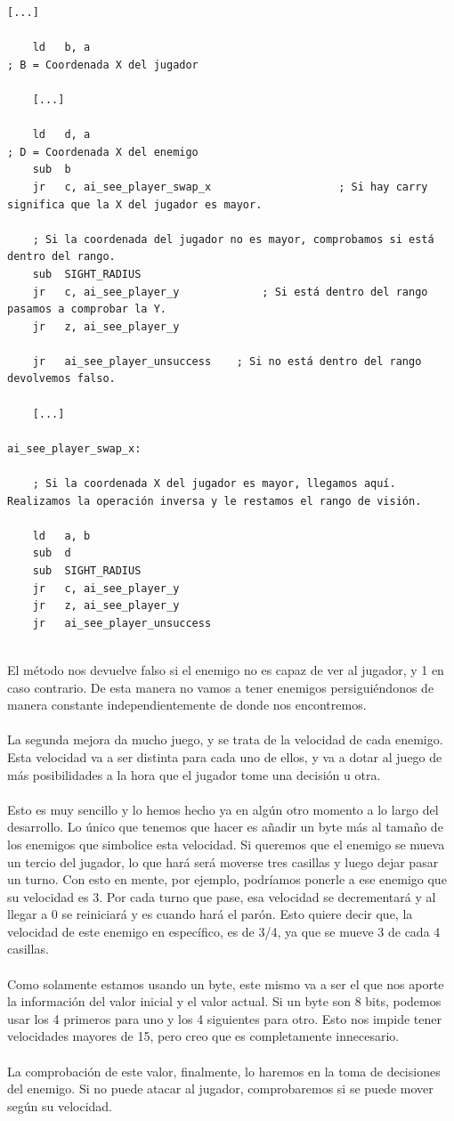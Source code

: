 \begin{lstlisting}[caption={Rango de Visión en los Enemigos}, label={code:sightradius}]
	[...]

	ld 	 b, a 															; B = Coordenada X del jugador

	[...]

	ld 	 d, a 															; D = Coordenada X del enemigo
	sub  b
	jr 	 c, ai_see_player_swap_x 	 				; Si hay carry significa que la X del jugador es mayor.

	; Si la coordenada del jugador no es mayor, comprobamos si está dentro del rango.
	sub  SIGHT_RADIUS
	jr 	 c, ai_see_player_y 			; Si está dentro del rango pasamos a comprobar la Y.
	jr 	 z, ai_see_player_y

	jr 	 ai_see_player_unsuccess 	; Si no está dentro del rango devolvemos falso.
	
	[...]
	
ai_see_player_swap_x:
	
	; Si la coordenada X del jugador es mayor, llegamos aquí. Realizamos la operación inversa y le restamos el rango de visión.	
	
	ld 	 a, b
	sub  d
	sub  SIGHT_RADIUS
	jr 	 c, ai_see_player_y
	jr 	 z, ai_see_player_y
	jr 	 ai_see_player_unsuccess	
	
\end{lstlisting}

El método nos devuelve falso si el enemigo no es capaz de ver al jugador, y 1 en caso contrario. De esta manera no vamos a tener enemigos persiguiéndonos de manera constante independientemente de donde nos encontremos.
\\ \\
La segunda mejora da mucho juego, y se trata de la velocidad de cada enemigo. Esta velocidad va a ser distinta para cada uno de ellos, y va a dotar al juego de más posibilidades a la hora que el jugador tome una decisión u otra.
\\ \\
Esto es muy sencillo y lo hemos hecho ya en algún otro momento a lo largo del desarrollo. Lo único que tenemos que hacer es añadir un byte más al tamaño de los enemigos que simbolice esta velocidad. Si queremos que el enemigo se mueva un tercio del jugador, lo que hará será moverse tres casillas y luego dejar pasar un turno. Con esto en mente, por ejemplo, podríamos ponerle a ese enemigo que su velocidad es 3. Por cada turno que pase, esa velocidad se decrementará y al llegar a 0 se reiniciará y es cuando hará el parón. Esto quiere decir que, la velocidad de este enemigo en específico, es de 3/4, ya que se mueve 3 de cada 4 casillas.
\\ \\
Como solamente estamos usando un byte, este mismo va a ser el que nos aporte la información del valor inicial y el valor actual. Si un byte son 8 bits, podemos usar los 4 primeros para uno y los 4 siguientes para otro. Esto nos impide tener velocidades mayores de 15, pero creo que es completamente innecesario.
\\ \\
La comprobación de este valor, finalmente, lo haremos en la toma de decisiones del enemigo. Si no puede atacar al jugador, comprobaremos si se puede mover según su velocidad.

